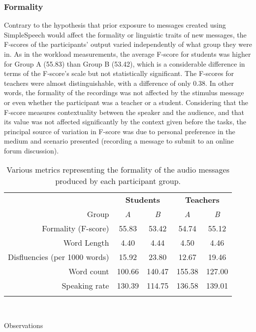 \subsubsection{Formality}
Contrary to the hypothesis that prior exposure to messages created using SimpleSpeech would affect the formality or linguistic traits of new messages, the F-scores of the participants' output varied independently of what group they were in.
As in the workload measurements, the average F-score for students was higher for Group A (55.83) than Group B (53.42), which is a considerable difference in terms of the F-score's scale but not statistically significant. 
The F-scores for teachers were almost distinguishable, with a difference of only 0.38.
In other words, the formality of the recordings was not affected by the stimulus message or even whether the participant was a teacher or a student.
Considering that the F-score measures contextuality between the speaker and the audience, and that its value was not affected significantly by the context given before the tasks, the principal source of variation in F-score was due to personal preference in the medium and scenario presented (recording a message to submit to an online forum discussion).

\begin{table*}
	\centering
	\begin{tabular}{r c c c c}
		\toprule
        & \multicolumn{2}{c}{\textbf{Students}} & \multicolumn{2}{c}{\textbf{Teachers}} \\
        \cmidrule(lr){2-3} \cmidrule(lr){4-5}
        Group                         & \textit{A}    & \textit{B}   & \textit{A}    & \textit{B}   \\
        Formality (F-score)           & 55.83         & 53.42        & 54.74         & 55.12        \\
        Word Length                   & 4.40          & 4.44         & 4.50          & 4.46         \\
        Disfluencies (per 1000 words) & 15.92         & 23.80        & 12.67         & 19.46        \\
        Word count                    & 100.66        & 140.47       & 155.38        & 127.00       \\
        Speaking rate                 & 130.39        & 114.75       & 136.58        & 139.01       \\
		\bottomrule \\
	\end{tabular}
	\caption{Various metrics representing the formality of the audio messages produced by each participant group.}~\label{tab:table2}
\end{table*}
	
Observations

